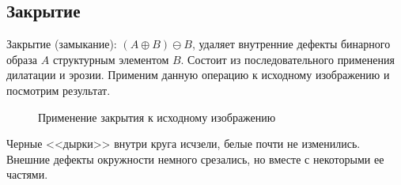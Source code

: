 \documentclass[a4paper, 12pt]{article}
\begin{document}
    \subsection{Закрытие}
    Закрытие (замыкание): $(A\oplus B)\ominus B$, удаляет внутренние дефекты бинарного образа $A$ структурным элементом $B$.
    Состоит из последовательного применения дилатации и эрозии. Применим данную операцию к исходному изображению и посмотрим
    результат.
    \begin{figure}[H]
        \centering
        \captionsetup{skip=0pt}
        \caption{Применение закрытия к исходному изображению}
        \label{fig:cl1}
    \end{figure}
    Черные <<дырки>> внутри круга исчзели, белые почти не изменились. Внешние дефекты окружности немного срезались, но
    вместе с некоторыми ее частями.
\end{document}
